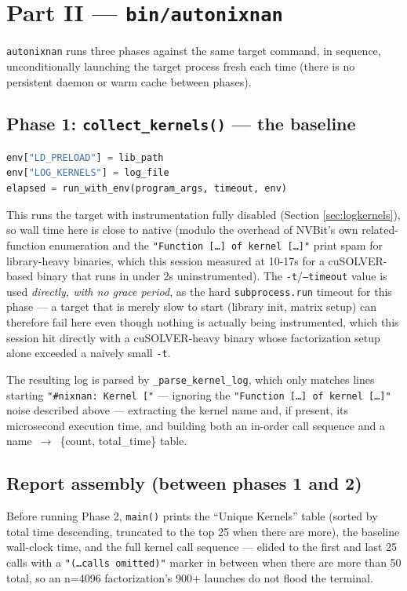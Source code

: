 \documentclass[11pt]{article}
\begin{document}
\section{Part II --- \texttt{bin/autonixnan}}

\texttt{autonixnan} runs three phases against the same target command,
in sequence, unconditionally launching the target process fresh each
time (there is no persistent daemon or warm cache between phases).

\subsection{Phase 1: \texttt{collect\_kernels()} --- the baseline}

\begin{lstlisting}[language=Python]
env["LD_PRELOAD"] = lib_path
env["LOG_KERNELS"] = log_file
elapsed = run_with_env(program_args, timeout, env)
\end{lstlisting}

This runs the target with instrumentation fully disabled (Section
\ref{sec:logkernels}), so wall time here is close to native (modulo the
overhead of NVBit's own related-function enumeration and the
\texttt{"Function [\ldots] of kernel [\ldots]"} print spam for
library-heavy binaries, which this session measured at 10-17s for a
cuSOLVER-based binary that runs in under 2s uninstrumented). The
\texttt{-t}/\texttt{--timeout} value is used \emph{directly, with no
grace period}, as the hard \texttt{subprocess.run} timeout for this
phase --- a target that is merely slow to start (library init, matrix
setup) can therefore fail here even though nothing is actually being
instrumented, which this session hit directly with a cuSOLVER-heavy
binary whose factorization setup alone exceeded a naively small
\texttt{-t}.

The resulting log is parsed by \texttt{\_parse\_kernel\_log}, which only
matches lines starting \texttt{"\#nixnan: Kernel ["} --- ignoring the
\texttt{"Function [\ldots] of kernel [\ldots]"} noise described above ---
extracting the kernel name and, if present, its microsecond execution
time, and building both an in-order call sequence and a
name~$\to$~\{count, total\_time\} table.

\subsection{Report assembly (between phases 1 and 2)}

Before running Phase 2, \texttt{main()} prints the ``Unique Kernels''
table (sorted by total time descending, truncated to the top 25 when
there are more), the baseline wall-clock time, and the full kernel call
sequence --- elided to the first and last 25 calls with a
\texttt{"(\ldots calls omitted)"} marker in between when there are more
than 50 total, so an n=4096 factorization's 900+ launches do not flood
the terminal.
\end{document}
